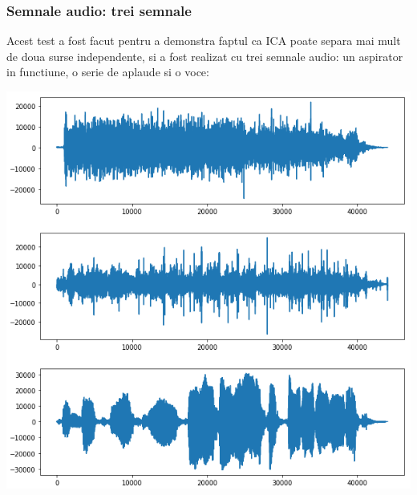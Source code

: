 \documentclass[12pt]{article}
\begin{document}
 \subsubsection{Semnale audio: trei semnale}
 Acest test a fost facut pentru a demonstra faptul ca ICA poate separa mai mult de doua surse independente, si a fost realizat cu trei semnale audio: un aspirator in functiune, o serie de aplaude si o voce:
\begin{center}
	\includegraphics[scale=1]{three_initial}
 \end{center}
\end{document}
